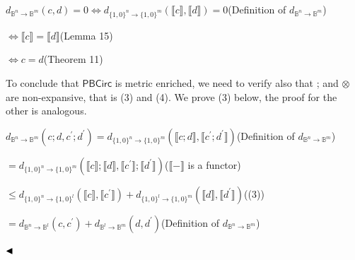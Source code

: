 \par  \quad  $\displaystyle d_{\mathbb{B}^{n}\to\mathbb{B}^{m}}(c,d)=0$\quad  $\displaystyle\iff d_{\{1,0\}^{n}\to\{1,0\}^{m}}(\llbracket c\rrbracket,\llbracket d\rrbracket)=0$\quad  \quad  (Definition of $d_{\mathbb{B}^{n}\to\mathbb{B}^{m}}$)\quad  
 
\par  \quad  \quad  $\displaystyle\iff\llbracket c\rrbracket=\llbracket d\rrbracket$\quad  \quad  (Lemma 15)\quad  
 
\par  \quad  \quad  $\displaystyle\iff c=d$\quad  \quad  (Theorem 11)\quad  
  
 
 
To conclude that $\mathsf{PBCirc}$ is metric enriched, we need to verify also that ; and $\otimes$ are non-expansive, that is (3) and (4). We prove (3) below, the proof for the other is analogous.\par
  
\par  \quad  $\displaystyle d_{\mathbb{B}^{n}\to\mathbb{B}^{m}}(c;d,c^{\prime};d^{\prime})$\quad  $\displaystyle=d_{\{1,0\}^{n}\to\{1,0\}^{m}}(\llbracket c;d\rrbracket,\llbracket c^{\prime};d^{\prime}\rrbracket)$\quad  \quad  (Definition of $d_{\mathbb{B}^{n}\to\mathbb{B}^{m}}$)\quad  
 
\par  \quad  \quad  $\displaystyle=d_{\{1,0\}^{n}\to\{1,0\}^{m}}(\llbracket c\rrbracket;\llbracket d\rrbracket,\llbracket c^{\prime}\rrbracket;\llbracket d^{\prime}\rrbracket)$\quad  \quad  ($\llbracket-\rrbracket$ is a functor)\quad  
 
\par  \quad  \quad  $\displaystyle\leq d_{\{1,0\}^{n}\to\{1,0\}^{l}}(\llbracket c\rrbracket,\llbracket c^{\prime}\rrbracket)+d_{\{1,0\}^{l}\to\{1,0\}^{m}}(\llbracket d\rrbracket,\llbracket d^{\prime}\rrbracket)$\quad  \quad  ((3))\quad  
 
\par  \quad  \quad  $\displaystyle=d_{\mathbb{B}^{n}\to\mathbb{B}^{l}}(c,c^{\prime})+d_{\mathbb{B}^{l}\to\mathbb{B}^{m}}(d,d^{\prime})$\quad  \quad  (Definition of $d_{\mathbb{B}^{n}\to\mathbb{B}^{m}}$)\quad  
  
$\hfill\blacktriangleleft$\par
 
 
 
